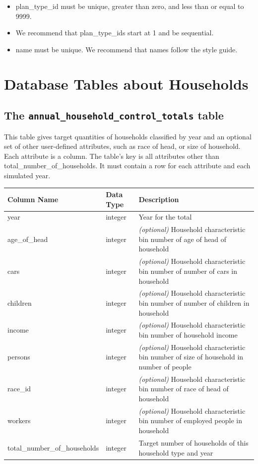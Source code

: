 \begin{itemize} \tight
\item plan_type_id must be unique, greater than zero, and less than or equal to 9999.
\item We recommend that plan_type_ids start at 1 and be sequential.
\item name must be unique. We recommend that names follow the style guide.

\end{itemize}

\section{Database Tables about Households}
\label{sec:household-tables}


\subsection{The {\tt annual_household_control_totals} table}
\label{sec:household-tables-ahct}

This table gives target quantities of households classified by year and an
optional set of other user-defined attributes, such as
race of
head, or size of household.  Each attribute is a column.  The table's key is all
attributes other than total_number_of_households.  It must
contain a row for each attribute and each simulated year.

\begin{tabular}{|l|l|p{4in}|}
\hline
\textbf{Column Name} & \textbf{Data Type} & \textbf{Description} \\
\hline
year & integer & Year for the total  \\
\hline
age_of_head & integer & \emph{(optional) }
Household characteristic bin number of age of head of household  \\
\hline
cars & integer & \emph{(optional) }
Household characteristic bin number of number of cars in household  \\
\hline
children & integer & \emph{(optional) }
Household characteristic bin number of number of children in household  \\
\hline
income & integer & \emph{(optional) }
Household characteristic bin number of household income  \\
\hline
persons & integer & \emph{(optional) }
Household characteristic bin number of size of household in number of people  \\
\hline
race_id & integer & \emph{(optional) }
Household characteristic bin number of race of head of household  \\
\hline
workers & integer & \emph{(optional) }
Household characteristic bin number of employed people in household  \\
\hline
total_number_of_households & integer & Target number of households of this household type and year  \\
\hline

\end{tabular}

